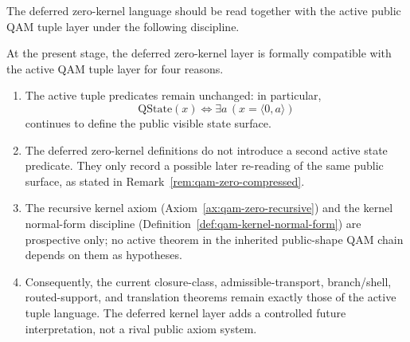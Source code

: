The deferred zero-kernel language should be read together with the active public QAM tuple layer under the following discipline.

\begin{remark}\label{rem:qam-zero-axiom-audit}
At the present stage, the deferred zero-kernel layer is formally compatible with the active QAM tuple layer for four reasons.
\begin{enumerate}
\item The active tuple predicates remain unchanged: in particular,
\[
\mathrm{QState}(x)\Longleftrightarrow \exists a\,(x=\langle 0,a\rangle)
\]
continues to define the public visible state surface.
\item The deferred zero-kernel definitions do not introduce a second active state predicate. They only record a possible later re-reading of the same public surface, as stated in Remark~\ref{rem:qam-zero-compressed}.
\item The recursive kernel axiom (Axiom~\ref{ax:qam-zero-recursive}) and the kernel normal-form discipline (Definition~\ref{def:qam-kernel-normal-form}) are prospective only; no active theorem in the inherited public-shape QAM chain depends on them as hypotheses.
\item Consequently, the current closure-class, admissible-transport, branch/shell, routed-support, and translation theorems remain exactly those of the active tuple language. The deferred kernel layer adds a controlled future interpretation, not a rival public axiom system.
\end{enumerate}
\end{remark}

